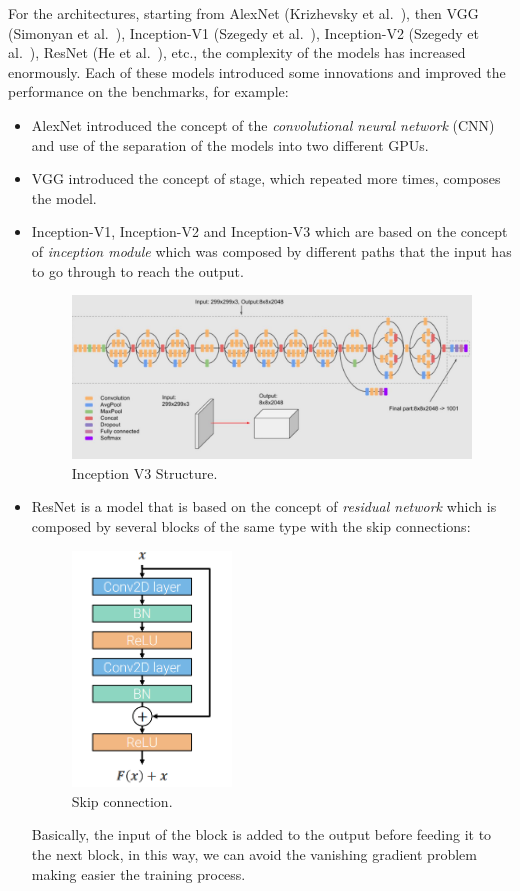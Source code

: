 For the architectures, starting from AlexNet (Krizhevsky et al.~\cite{alex_net_paper}), then VGG (Simonyan et al.~\cite{vgg_paper}), Inception-V1 (Szegedy et al.~\cite{inception_v1_paper}), Inception-V2 (Szegedy et al.~\cite{inception_v2_paper}), ResNet (He et al.~\cite{resnet_paper}), etc., the complexity of the models has increased enormously.
Each of these models introduced some innovations and improved the performance on the benchmarks, for example:
\begin{itemize}
    \item AlexNet introduced the concept of the \emph{convolutional neural network} (CNN) and use of the separation of the models into two different GPUs.
    \item VGG introduced the concept of stage, which repeated more times, composes the model.
    \item Inception-V1, Inception-V2 and Inception-V3 which are based on the concept of \emph{inception module} which was composed by different paths that the input has to go through to reach the output.
    \begin{figure}[H]
        \centering
        \includegraphics[width=\textwidth]{images/2_inception_v3}
        \caption{Inception V3 Structure.}\label{fig:inception-v3}
    \end{figure}
    \item ResNet is a model that is based on the concept of \emph{residual network} which is composed by several blocks of the same type with the skip connections:
    \begin{figure}[H]
        \centering
        \includegraphics[width=0.4\textwidth]{images/2_1_skip_connection}
        \caption{Skip connection.}\label{fig:skip-connection}
    \end{figure}
    Basically, the input of the block is added to the output before feeding it to the next block, in this way, we can avoid the \gls{vanishing gradient problem} making easier the training process.
\end{itemize}
